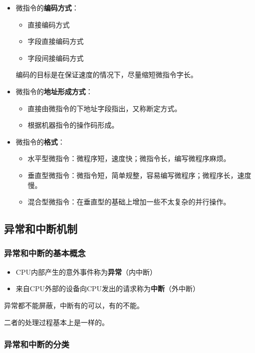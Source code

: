 \documentclass[12pt, a4paper, oneside]{ctexart}
\begin{document}
\begin{itemize}
  \item 微指令的\textbf{编码方式}：
  \begin{itemize}
    \item 直接编码方式
    \item 字段直接编码方式
    \item 字段间接编码方式
  \end{itemize}
  编码的目标是在保证速度的情况下，尽量缩短微指令字长。
  \item 微指令的\textbf{地址形成方式}：
  \begin{itemize}
    \item 直接由微指令的下地址字段指出，又称断定方式。
    \item 根据机器指令的操作码形成。
  \end{itemize}
  \item 微指令的\textbf{格式}：
  \begin{itemize}
    \item 水平型微指令：微程序短，速度快；微指令长，编写微程序麻烦。
    \item 垂直型微指令：微指令短，简单规整，容易编写微程序；微程序长，速度慢。
    \item 混合型微指令：在垂直型的基础上增加一些不太复杂的并行操作。
  \end{itemize}
\end{itemize}

\subsection{异常和中断机制}

\subsubsection{异常和中断的基本概念}

\begin{itemize}
  \item CPU内部产生的意外事件称为\textbf{异常}（内中断）
  \item 来自CPU外部的设备向CPU发出的请求称为\textbf{中断}（外中断）
\end{itemize}

异常都不能屏蔽，中断有的可以，有的不能。

二者的处理过程基本上是一样的。

\subsubsection{异常和中断的分类}
\end{document}
